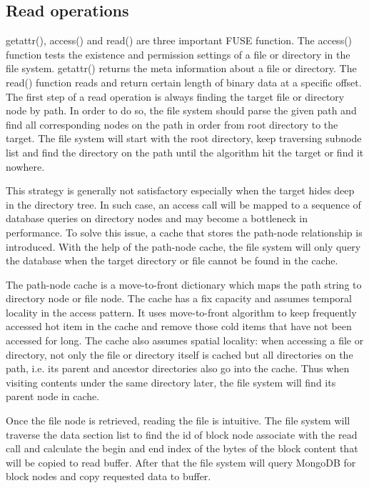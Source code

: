 \subsection{Read operations}
    getattr(), access() and read() are three important FUSE function. The access() function tests the existence and permission settings of a file or directory in the file system. getattr() returns the meta information about a file or directory. The read() function reads and return certain length of binary data at a specific offset.
The first step of a read operation is always finding the target file or directory node by path. In order to do so, the file system should parse the given path and find all corresponding nodes on the path in order from root directory to the target. The file system will start with the root directory, keep traversing subnode list and find the directory on the path until the algorithm hit the target or find it nowhere.

    This strategy is generally not satisfactory especially when the target hides deep in the directory tree. In such case, an access call will be mapped to a sequence of database queries on directory nodes and may become a bottleneck in performance. To solve this issue, a cache that stores the path-node relationship is introduced. With the help of the path-node cache, the file system will only query the database when the target directory or file cannot be found in the cache.

    The path-node cache is a move-to-front dictionary which maps the path string to directory node or file node. The cache has a fix capacity and assumes temporal locality in the access pattern. It uses move-to-front algorithm to keep frequently accessed hot item in the cache and remove those cold items that have not been accessed for long. The cache also assumes spatial locality: when accessing a file or directory, not only the file or directory itself is cached but all directories on the path, i.e. its parent and ancestor directories also go into the cache. Thus when visiting contents under the same directory later, the file system will find its parent node in cache.

    Once the file node is retrieved, reading the file is intuitive. The file system will traverse the data section list to find the id of block node associate with the read call and calculate the begin and end index of the bytes of the block content that will be copied to read buffer. After that the file system will query MongoDB for block nodes and copy requested data to buffer.

